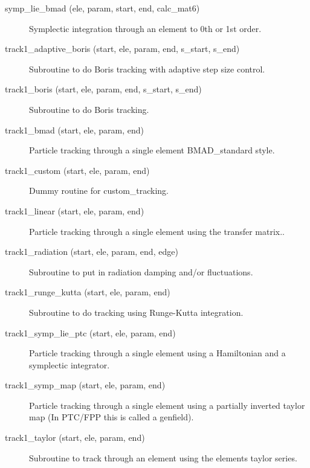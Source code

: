 \begin{description}

\item[symp_lie_bmad (ele, param, start, end, calc_mat6)] \Newline
Symplectic integration through an element to 0th or 1st order.

\item[track1_adaptive_boris (start, ele, param, end, s_start, s_end)] \Newline
Subroutine to do Boris tracking with adaptive step size control. 

\item[track1_boris (start, ele, param, end, s_start, s_end)] \Newline
Subroutine to do Boris tracking.  

\item[track1_bmad (start, ele, param, end)] \Newline
Particle tracking through a single element BMAD_standard style. 

\item[track1_custom (start, ele, param, end)] \Newline
Dummy routine for custom_tracking.

\item[track1_linear (start, ele, param, end)] \Newline
Particle tracking through a single element using the transfer matrix.. 

\item[track1_radiation (start, ele, param, end, edge)] \Newline
Subroutine to put in radiation damping and/or fluctuations. 

\item[track1_runge_kutta (start, ele, param, end)] \Newline
Subroutine to do tracking using Runge-Kutta integration. 

\item[track1_symp_lie_ptc (start, ele, param, end)] \Newline
Particle tracking through a single element using a Hamiltonian and a 
symplectic integrator. 

\item[track1_symp_map (start, ele, param, end)] \Newline
Particle tracking through a single element using a partially inverted 
taylor map (In PTC/FPP this is called a genfield). 

\item[track1_taylor (start, ele, param, end)] \Newline
Subroutine to track through an element using the elements taylor series. 

\end{description}

